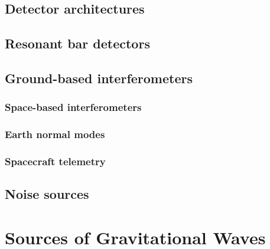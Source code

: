 \documentclass{kentigern}
\theoremstyle{definition}
\begin{document}
 

 \section{Detector architectures}
 \label{sec:detect-arch}

 \section{Resonant bar detectors}
 \label{sec:reson-bar-detect}

 \section{Ground-based interferometers}
 \label{sec:ground-based-interf}
 


 \subsection{Space-based interferometers}
 \label{sec:space-based-interf}

 \subsection{Earth normal modes}
 \label{sec:earth-normal-modes}

 \subsection{Spacecraft telemetry}
 \label{sec:spacecraft-telemetry}
 
 \section{Noise sources}
 \label{sec:an-overview-noise}
 


 \chapter{Sources of Gravitational Waves}
 \label{cha:sourc-grav-waves}
 \chapterprecis{}
 
\end{document}
